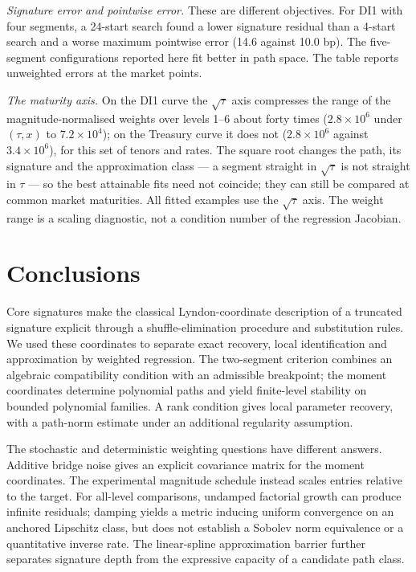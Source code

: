 \documentclass[11pt,english]{article}
\theoremstyle{definition}
\theoremstyle{remark}
\begin{document}
\emph{Signature error and pointwise error.} These are different
objectives. For DI1 with four segments, a 24-start search found a
lower signature residual than a 4-start search and a worse maximum
pointwise error (14.6 against 10.0 bp). The five-segment configurations reported
here fit better in path space. The table reports unweighted errors at
the market points.


\emph{The maturity axis.} On the DI1 curve the $\sqrt{\tau}$ axis
compresses the range of the magnitude-normalised weights over levels
1--6 about forty times ($2.8\times10^{6}$ under $(\tau,x)$ to
$7.2\times10^{4}$); on the Treasury curve it does not
($2.8\times10^{6}$ against $3.4\times10^{6}$), for this set of tenors
and rates. The square root changes the path, its signature and the
approximation class --- a segment straight in $\sqrt{\tau}$ is not
straight in $\tau$ --- so the best attainable fits need not coincide;
they can still be compared at common market maturities. All fitted
examples use the $\sqrt{\tau}$ axis. The weight range is a scaling
diagnostic, not a condition number of the regression Jacobian.


\section{Conclusions}

Core signatures make the classical Lyndon-coordinate description
of a truncated signature explicit through a shuffle-elimination
procedure and substitution rules. We used these coordinates to
separate exact recovery, local identification and approximation by
weighted regression. The two-segment criterion combines an
algebraic compatibility condition with an admissible breakpoint;
the moment coordinates determine polynomial paths and yield
finite-level stability on bounded polynomial families. A rank
condition gives local parameter recovery, with a path-norm estimate
under an additional regularity assumption.

The stochastic and deterministic weighting questions have different
answers. Additive bridge noise gives an explicit covariance matrix
for the moment coordinates. The experimental magnitude schedule
instead scales entries relative to the target. For all-level
comparisons, undamped factorial growth can produce infinite
residuals; damping yields a metric inducing uniform convergence
on an anchored Lipschitz class, but does not establish a Sobolev
norm equivalence or a quantitative inverse rate. The linear-spline
approximation barrier further separates signature depth from the
expressive capacity of a candidate path class.
\end{document}

